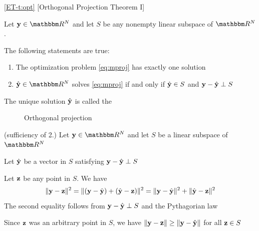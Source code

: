 \begin{frame}
    
     \vspace{2em}
    \Thm\eqref{ET-t:opt}
    [Orthogonal Projection Theorem I]
    
    Let $\boldy \in \RR^N$ and let $S$ be any nonempty linear subspace of $\RR^N$. 
    
    The
    following statements are true:
    \begin{enumerate}
        \item  The optimization problem \eqref{eq:mproj} has exactly one solution
        \item $\hboldy \in \RR^N$ solves \eqref{eq:mproj}
            if and only if $\hat {{\mathbf y}} \in S$ and ${\mathbf y} - \hat {{\mathbf y}} \perp
            S$
    \end{enumerate}
    
    \vspace{.7em}
    The unique solution $\hat {\mathbf y}$ is called the 

\end{frame}

\begin{frame}

    \vspace{2em}
    \begin{figure}
       \begin{center}
        
        \caption{\label{f:orth_proj2D0} Orthogonal projection}
       \end{center}
    \end{figure}

\end{frame}

\begin{frame}

     \vspace{2em}
    \Prf (sufficiency of 2.)
    Let $\boldy \in \RR^N$
    and let $S$ be a linear subspace of $\RR^N$
    
    Let $\hat {{\mathbf y}}$ be a vector in
    $S$ satisfying ${\mathbf y} - \hat {{\mathbf y}} \perp S$
    
    Let ${\mathbf z}$ be any point in $S$. We have
    \begin{equation*}
    \| {\mathbf y} - {\mathbf z} \|^2
    = \| ({\mathbf y} - \hat {{\mathbf y}}) + (\hat {{\mathbf y}} - {\mathbf z}) \|^2
    = \| {\mathbf y} - \hat {{\mathbf y}} \|^2  + \| \hat {{\mathbf y}} - {\mathbf z}  \|^2
    \end{equation*}
    The second equality follows from ${\mathbf y} - \hat {{\mathbf y}} \perp S$ and the 
    Pythagorian law
    
    \vspace{.7em}
    Since ${\mathbf z}$ was an arbitrary point in $S$,
    we have $\| {\mathbf y} - {\mathbf z} \| \geq \| {\mathbf y} - \hat {{\mathbf y}} \|$
    for all ${\mathbf z} \in S$
    
\end{frame}

